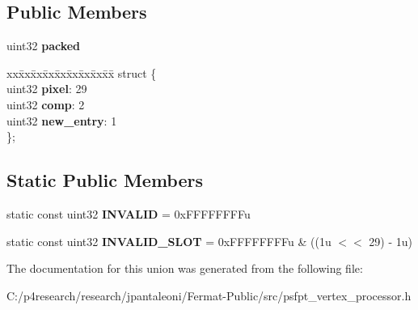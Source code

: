 \subsection*{Public Members}
\begin{DoxyCompactItemize}
\item 
\mbox{\label{union_p_s_f_p_t_vertex_processor_1_1_cache_info_a654d80283ab38c42f9d987fb1ffa4a5e}} 
uint32 {\bfseries packed}
\item 
\mbox{\label{union_p_s_f_p_t_vertex_processor_1_1_cache_info_a887f4c6d8361714cc67e25e7c21304b7}} 
\begin{tabbing}
xx\=xx\=xx\=xx\=xx\=xx\=xx\=xx\=xx\=\kill
struct \{\\
\>uint32 {\bfseries pixel}: 29\\
\>uint32 {\bfseries comp}: 2\\
\>uint32 {\bfseries new\_entry}: 1\\
\}; \\

\end{tabbing}\end{DoxyCompactItemize}
\subsection*{Static Public Members}
\begin{DoxyCompactItemize}
\item 
\mbox{\label{union_p_s_f_p_t_vertex_processor_1_1_cache_info_a67f1c5ce88f2344a6779b0fde7e04487}} 
static const uint32 {\bfseries I\+N\+V\+A\+L\+ID} = 0x\+F\+F\+F\+F\+F\+F\+F\+Fu
\item 
\mbox{\label{union_p_s_f_p_t_vertex_processor_1_1_cache_info_aec9e648c557a411b65c928a4193cd87d}} 
static const uint32 {\bfseries I\+N\+V\+A\+L\+I\+D\+\_\+\+S\+L\+OT} = 0x\+F\+F\+F\+F\+F\+F\+F\+Fu \& ((1u $<$$<$ 29) -\/ 1u)
\end{DoxyCompactItemize}


The documentation for this union was generated from the following file\+:\begin{DoxyCompactItemize}
\item 
C\+:/p4research/research/jpantaleoni/\+Fermat-\/\+Public/src/psfpt\+\_\+vertex\+\_\+processor.\+h\end{DoxyCompactItemize}
